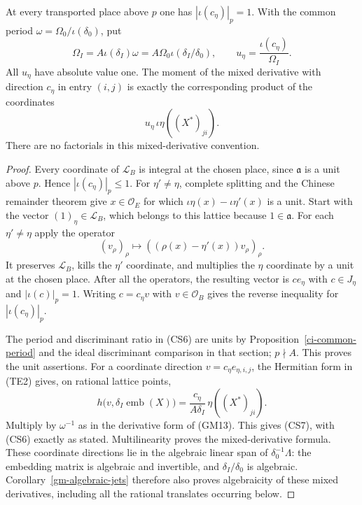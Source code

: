 \begin{lemma}\label{csp-coordinate-units}
At every transported place above $p$ one has
$|\iota(c_\eta)|_p=1$.
With the common period $\omega=\Omega_0/\iota(\delta_0)$,
put
\[
 \Omega_I=A\iota(\delta_I)\omega
       =A\Omega_0\iota(\delta_I/\delta_0),\qquad
            u_\eta=\frac{\iota(c_\eta)}{\Omega_I}.           \tag{CS6}
\]
All $u_\eta$ have absolute value one.  The moment of the
mixed derivative with direction $c_\eta$ in entry $(i,j)$
is exactly the corresponding product of the coordinates
\[
                         u_\eta\,\iota\eta((X^*)_{ji}).     \tag{CS7}
\]
There are no factorials in this mixed-derivative convention.
\end{lemma}
\begin{proof}
Every coordinate of $\mathcal L_B$ is integral at the chosen
place, since $\mathfrak a$ is a unit above $p$.  Hence
$|\iota(c_\eta)|_p\le1$.
For $\eta'\ne\eta$, complete splitting and the Chinese
remainder theorem give $x\in\mathcal O_E$ for which
$\iota\eta(x)-\iota\eta'(x)$ is a unit.  Start with the
vector $(1)_\eta\in\mathcal L_B$, which belongs to this
lattice because $1\in\mathfrak a$.  For each $\eta'\ne\eta$
apply the operator
\[
         (v_\rho)_\rho\longmapsto
                     ((\rho(x)-\eta'(x))v_\rho)_\rho.       \tag{CS8}
\]
It preserves $\mathcal L_B$, kills the $\eta'$ coordinate,
and multiplies the $\eta$ coordinate by a unit at the chosen
place.  After all the operators, the resulting vector is
$c e_\eta$ with $c\in J_\eta$ and $|\iota(c)|_p=1$.
Writing $c=c_\eta v$ with $v\in\mathcal O_B$ gives the
reverse inequality for $|\iota(c_\eta)|_p$.

The period and discriminant ratio in (CS6) are units by
Proposition~\ref{ci-common-period} and the ideal discriminant
comparison in that section; $p\nmid A$.  This proves the
unit assertions.
For a coordinate direction $v=c_\eta e_{\eta,i,j}$,
the Hermitian form in (TE2) gives, on rational lattice points,
\[
 h\bigl(v,\delta_I\operatorname{emb}(X)\bigr)
                 =\frac{c_\eta}{A\delta_I}\,
                                      \eta((X^*)_{ji}).      \tag{CS9}
\]
Multiply by $\omega^{-1}$ as in the derivative form of
(GM13).  This gives (CS7), with (CS6) exactly as stated.
Multilinearity proves the mixed-derivative formula.  These
coordinate directions lie in the algebraic linear span of
$\delta_0^{-1}\Lambda$: the embedding matrix is algebraic
and invertible, and $\delta_I/\delta_0$ is algebraic.
Corollary~\ref{gm-algebraic-jets} therefore also proves
algebraicity of these mixed derivatives, including all the
rational translates occurring below.
\end{proof}

